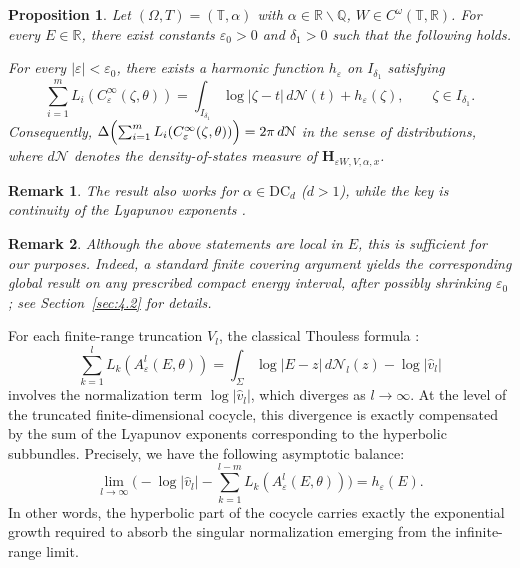\documentclass[reqno,11pt]{amsart}
\newtheorem{proposition}{Proposition}[section]
\newtheorem{remark}{Remark}[section]
\begin{document}
\begin{proposition}
\label{prop:thouless}
Let $(\Omega,T)=(\mathbb T,\alpha)$ with $\alpha\in \mathbb{R}\backslash\mathbb{Q}$,
$W\in C^\omega(\mathbb T,\mathbb R)$.
For every $E\in\mathbb R$, there exist constants
$\varepsilon_0>0$ and $\delta_1>0$
such that the following holds.

For every $|\varepsilon|<\varepsilon_0$, there exists a harmonic function
$h_\varepsilon$ on $I_{\delta_1}$ satisfying
\begin{equation}\label{eq:thou}
\sum_{i=1}^{m}
L_i\!\left(C^\infty_\varepsilon(\zeta,\theta)\right)
=\int_{I_{\delta_1}}\log |\zeta-t|\, d\mathcal N(t)
+h_\varepsilon(\zeta),
\qquad\zeta\in I_{\delta_1}.
\end{equation}
Consequently, $
\Delta\Bigl(\sum_{i=1}^{m}L_i(C^\infty_\varepsilon(\zeta,\theta))
\Bigr)=2\pi\, d\mathcal N$ 
in the sense of distributions, where
$d\mathcal N$ denotes the density-of-states measure of
$\mathbf H_{\varepsilon W,V,\alpha,x}$.
\end{proposition}
\begin{remark}
    The result also works for $\alpha\in \mathrm{DC}_d$ ($d>1$), while the key is continuity of the Lyapunov exponents \cite{DK}.  
\end{remark}


\begin{remark}
Although the above statements are local in $E$, this is sufficient for our purposes. Indeed, a standard finite covering argument yields the corresponding global result on any prescribed compact energy interval, after possibly shrinking $\varepsilon_0$; see Section~\ref{sec:4.2} for details.
\end{remark}


For each finite-range truncation $V_l$, the classical Thouless formula \cite{HaroPuig}:
$$\sum_{k=1}^{l}L_k(A_{\varepsilon}^{l}(E,\theta))
=
\int_\Sigma \log|E-z|\,d\mathcal{N}_l(z) - \log|\hat{v}_l|$$involves the normalization term $\log |\hat{v}_l|$, which diverges as $l\to\infty$. At the level of the truncated finite-dimensional cocycle, this divergence is exactly compensated by the sum of the Lyapunov exponents corresponding to the  hyperbolic subbundles. Precisely, we have the following asymptotic balance:
\begin{equation}\label{eq:com}
    \lim_{l\to\infty} \bigg( - \log|\hat{v}_l| - \sum_{k=1}^{l-m}L_k(A_{\varepsilon}^{l}(E,\theta)) \bigg) = h_\varepsilon(E).
\end{equation}
In other words, the hyperbolic part of the cocycle carries exactly the exponential growth required to absorb the singular normalization emerging from the infinite-range limit.
\end{document}
